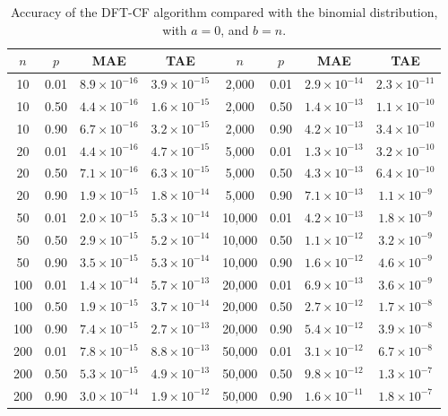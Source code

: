 \documentclass[12pt]{article}
\begin{document}
\begin{table}
\caption{Accuracy of the DFT-CF algorithm compared with the binomial distribution, with $a=0$, and $b=n$.}\label{table:accuracy2}
\vspace{1ex}
\centering
\begin{tabular}{cccc|cccc}\hline\hline
$n$ &$p$ &MAE 			     & TAE &           $n$  &$p$    & MAE                       & TAE \\\hline
10   &0.01  &$8.9\times10^{-16}$&$3.9\times10^{-15}$&2{,}000  &0.01   &$2.9\times10^{-14}$&$2.3\times10^{-11}$\\
10   &0.50  &$4.4\times10^{-16}$&$1.6\times10^{-15}$&2{,}000  &0.50   &$1.4\times10^{-13}$&$1.1\times10^{-10}$\\
10   &0.90  &$6.7\times10^{-16}$&$3.2\times10^{-15}$&2{,}000  &0.90   &$4.2\times10^{-13}$&$3.4\times10^{-10}$\\
20   &0.01  &$4.4\times10^{-16}$&$4.7\times10^{-15}$&5{,}000  &0.01   &$1.3\times10^{-13}$&$3.2\times10^{-10}$\\
20   &0.50  &$7.1\times10^{-16}$&$6.3\times10^{-15}$&5{,}000  &0.50   &$4.3\times10^{-13}$&$6.4\times10^{-10}$\\
20   &0.90  &$1.9\times10^{-15}$&$1.8\times10^{-14}$&5{,}000  &0.90   &$7.1\times10^{-13}$&$1.1\times10^{-9}$\\
50   &0.01  &$2.0\times10^{-15}$&$5.3\times10^{-14}$&10{,}000 &0.01   &$4.2\times10^{-13}$&$1.8\times10^{-9}$\\
50   &0.50  &$2.9\times10^{-15}$&$5.2\times10^{-14}$&10{,}000 &0.50   &$1.1\times10^{-12}$&$3.2\times10^{-9}$\\
50   &0.90  &$3.5\times10^{-15}$&$5.3\times10^{-14}$&10{,}000 &0.90   &$1.6\times10^{-12}$&$4.6\times10^{-9}$\\
100  &0.01  &$1.4\times10^{-14}$&$5.7\times10^{-13}$&20{,}000 &0.01   &$6.9\times10^{-13}$&$3.6\times10^{-9}$\\
100  &0.50  &$1.9\times10^{-15}$&$3.7\times10^{-14}$&20{,}000 &0.50   &$2.7\times10^{-12}$&$1.7\times10^{-8}$\\
100  &0.90  &$7.4\times10^{-15}$&$2.7\times10^{-13}$&20{,}000 &0.90   &$5.4\times10^{-12}$&$3.9\times10^{-8}$\\
200  &0.01  &$7.8\times10^{-15}$&$8.8\times10^{-13}$&50{,}000 &0.01   &$3.1\times10^{-12}$&$6.7\times10^{-8}$\\
200  &0.50  &$5.3\times10^{-15}$&$4.9\times10^{-13}$&50{,}000 &0.50   &$9.8\times10^{-12}$&$1.3\times10^{-7}$\\
200  &0.90  &$3.0\times10^{-14}$&$1.9\times10^{-12}$&50{,}000 &0.90   &$1.6\times10^{-11}$&$1.8\times10^{-7}$\\

\end{tabular}
\end{table}
\end{document}
